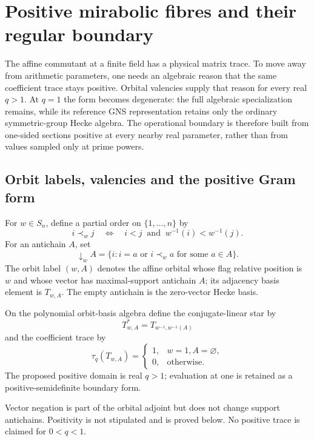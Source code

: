 \clearpage
\section{Positive mirabolic fibres and their regular boundary}
\label{sec:f1-limit-boundary}

The affine commutant at a finite field has a physical matrix trace.  To move
away from arithmetic parameters, one needs an algebraic reason that the same
coefficient trace stays positive.  Orbital valencies supply that reason for
every real $q>1$.  At $q=1$ the form becomes degenerate: the full algebraic
specialization remains, while its reference GNS representation retains only
the ordinary symmetric-group Hecke algebra.  The operational boundary is
therefore built from one-sided sections positive at every nearby real
parameter, rather than from values sampled only at prime powers.

\subsection{Orbit labels, valencies and the positive Gram form}

\begin{definition}
For $w\in S_n$, define a partial order on $\{1,\ldots,n\}$ by
\[
 i\prec_wj\quad\Longleftrightarrow\quad
 i<j\ \text{ and }\ w^{-1}(i)<w^{-1}(j).
\]
For an antichain $A$, set
\[
 \downarrow_w A=\{i:i=a\text{ or }i\prec_wa
                         \text{ for some }a\in A\}.
\]
The orbit label $(w,A)$ denotes the affine orbital whose flag relative
position is $w$ and whose vector has maximal-support antichain $A$; its
adjacency basis element is $T_{w,A}$.  The empty antichain is the zero-vector
Hecke basis.

On the polynomial orbit-basis algebra define the conjugate-linear star by
\[
 T_{w,A}^*=T_{w^{-1},w^{-1}(A)}
\]
and the coefficient trace by
\[
 \tau_q(T_{w,A})=\begin{cases}1,&w=1, A=\varnothing,\\0,&\text{otherwise}.
 \end{cases}
\]
The proposed positive domain is real $q>1$; evaluation at one is retained as
a positive-semidefinite boundary form.
\end{definition}
\begin{scope}
Vector negation is part of the orbital adjoint but does not change support
antichains.  Positivity is not stipulated and is proved below.  No positive
trace is claimed for $0<q<1$.
\end{scope}

